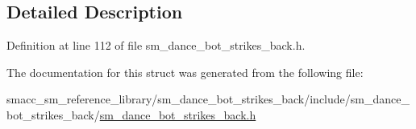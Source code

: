 \subsection{Detailed Description}


Definition at line 112 of file sm\+\_\+dance\+\_\+bot\+\_\+strikes\+\_\+back.\+h.



The documentation for this struct was generated from the following file\+:\begin{DoxyCompactItemize}
\item 
smacc\+\_\+sm\+\_\+reference\+\_\+library/sm\+\_\+dance\+\_\+bot\+\_\+strikes\+\_\+back/include/sm\+\_\+dance\+\_\+bot\+\_\+strikes\+\_\+back/\hyperlink{sm__dance__bot__strikes__back_8h}{sm\+\_\+dance\+\_\+bot\+\_\+strikes\+\_\+back.\+h}\end{DoxyCompactItemize}
